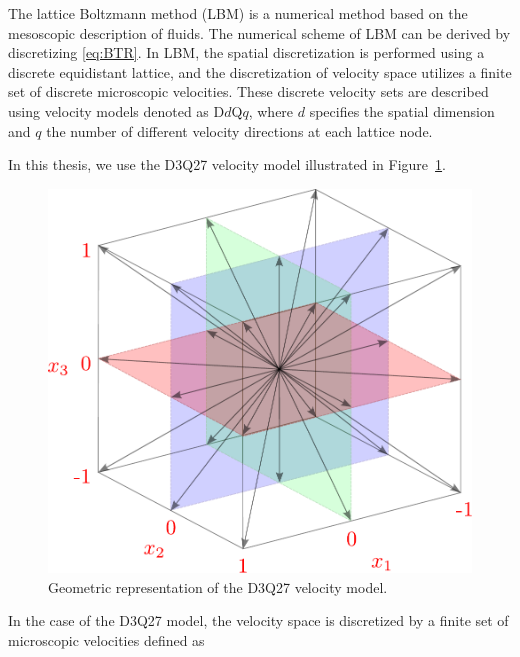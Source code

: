 The lattice Boltzmann method (LBM) is a numerical method based on the mesoscopic description of fluids. The numerical scheme of LBM can be derived by discretizing \eqref{eq:BTR}. In LBM, the spatial discretization is performed using a discrete equidistant lattice, and the discretization of velocity space utilizes a finite set of discrete microscopic velocities. These discrete velocity sets are described using velocity models denoted as D$d$Q$q$, where $ d$  specifies the spatial dimension and $q$ the number of different velocity directions at each lattice node.

In this thesis, we use the D3Q27 velocity model illustrated in Figure~\ref{fig:d3q27}.

\begin{figure}[h]
	\centering
	\vspace{4mm}
	\includegraphics[width=.6\textwidth]{figures/d3q27.pdf}
	\caption{Geometric representation of the D3Q27 velocity model.}
	\label{fig:d3q27}
\end{figure}

In the case of the D3Q27 model, the velocity space is discretized by a finite set of microscopic velocities defined as

